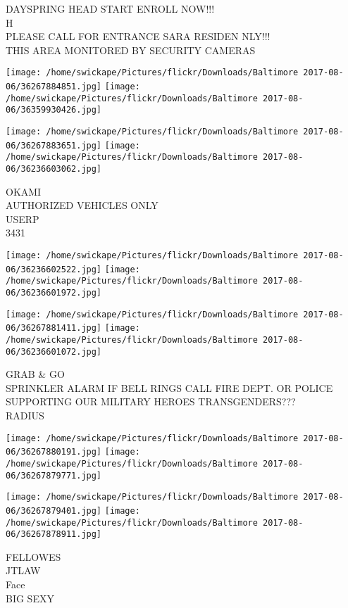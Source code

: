 \documentclass[10pt,letterpaper]{article}
\begin{document}
DAYSPRING HEAD START ENROLL NOW!!!\\
H\\
PLEASE CALL FOR ENTRANCE SARA RESIDEN NLY!!!\\
THIS AREA MONITORED BY SECURITY CAMERAS\\
\pagebreak

\texttt{[image: /home/swickape/Pictures/flickr/Downloads/Baltimore 2017-08-06/36267884851.jpg]}
\texttt{[image: /home/swickape/Pictures/flickr/Downloads/Baltimore 2017-08-06/36359930426.jpg]}

\texttt{[image: /home/swickape/Pictures/flickr/Downloads/Baltimore 2017-08-06/36267883651.jpg]}
\texttt{[image: /home/swickape/Pictures/flickr/Downloads/Baltimore 2017-08-06/36236603062.jpg]}

OKAMI\\
AUTHORIZED VEHICLES ONLY\\
USERP\\
3431\\
\pagebreak

\texttt{[image: /home/swickape/Pictures/flickr/Downloads/Baltimore 2017-08-06/36236602522.jpg]}
\texttt{[image: /home/swickape/Pictures/flickr/Downloads/Baltimore 2017-08-06/36236601972.jpg]}

\texttt{[image: /home/swickape/Pictures/flickr/Downloads/Baltimore 2017-08-06/36267881411.jpg]}
\texttt{[image: /home/swickape/Pictures/flickr/Downloads/Baltimore 2017-08-06/36236601072.jpg]}

GRAB \& GO\\
SPRINKLER ALARM IF BELL RINGS CALL FIRE DEPT. OR POLICE\\
SUPPORTING OUR MILITARY HEROES TRANSGENDERS???\\
RADIUS\\
\pagebreak

\texttt{[image: /home/swickape/Pictures/flickr/Downloads/Baltimore 2017-08-06/36267880191.jpg]}
\texttt{[image: /home/swickape/Pictures/flickr/Downloads/Baltimore 2017-08-06/36267879771.jpg]}

\texttt{[image: /home/swickape/Pictures/flickr/Downloads/Baltimore 2017-08-06/36267879401.jpg]}
\texttt{[image: /home/swickape/Pictures/flickr/Downloads/Baltimore 2017-08-06/36267878911.jpg]}

FELLOWES\\
JTLAW\\
Face\\
BIG SEXY\\
\pagebreak
\end{document}
